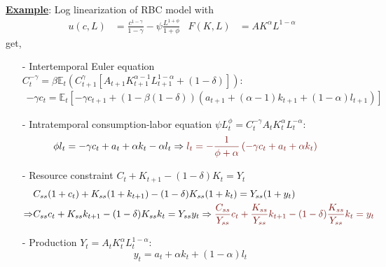 \documentclass[10pt,landscape,a4paper]{article}
\begin{document}
\begin{multicols*}{3}
\vspace{2pt}
\underline{\textbf{\color{myred}Example}}: Log linearization of RBC model with 
\begin{align*}
    u(c,L)&=\frac{c^{1-\gamma}}{1-\gamma}-\psi\frac{L^{1+\phi}}{1+\phi} & F(K,L) &=AK^{\alpha}L^{1-\alpha}
\end{align*}
get,
\begin{itemize}
    \item[-] Intertemporal Euler equation $C_t^{-\gamma}=\beta \mathbb{E}_t\left( C_{t+1}^{\gamma}\left[ A_{t+1}K_{t+1}^{\alpha-1}L_{t+1}^{1-\alpha}+(1-\delta)\right] \right)$:
    {\color{myred}\begin{align*}
        -\gamma c_t = \mathbb{E}_t\left[ -\gamma c_{t+1} + (1-\beta(1-\delta)) \left(a_{t+1}+(\alpha-1)k_{t+1}+(1-\alpha)l_{t+1}\right) \right]
    \end{align*}}
    
    \item[-] Intratemporal consumption-labor equation $\psi L^{\phi}_t=C_t^{-\gamma}A_tK_t^{\alpha} L_t^{-\alpha}$:
    \begin{align*}
        \phi l_t = -\gamma c_t + a_t +\alpha k_t -\alpha l_t &\Rightarrow {\color{myred}l_t  = -\frac{1}{\phi+\alpha}\left(-\gamma c_t+a_t+\alpha k_t\right)}
    \end{align*}
    \item[-] Resource constraint $ C_t+K_{t+1}-(1-\delta)K_t = Y_t$
    \begin{align*}
        &C_{ss}(1+c_t)+K_{ss}(1+k_{t+1})-(1-\delta)K_{ss}(1+k_t)= Y_{ss}(1+y_t)\\
        \Rightarrow & C_{ss}c_t +K_{ss}k_{t+1} - (1-\delta)K_{ss}k_t = Y_{ss}y_t\Rightarrow{\color{myred}\frac{C_{ss}}{Y_{ss}}c_t +\frac{K_{ss}}{Y_{ss}}k_{t+1} - (1-\delta)\frac{K_{ss}}{Y_{ss}}k_t = y_t}
    \end{align*}
    \item[-] Production $Y_t=A_tK_t^{\alpha}L_t^{1-\alpha}$:
    $$
    y_t = a_t +\alpha k_t +(1-\alpha)l_t
    $$
\end{itemize}


\end{multicols*}
\end{document}
